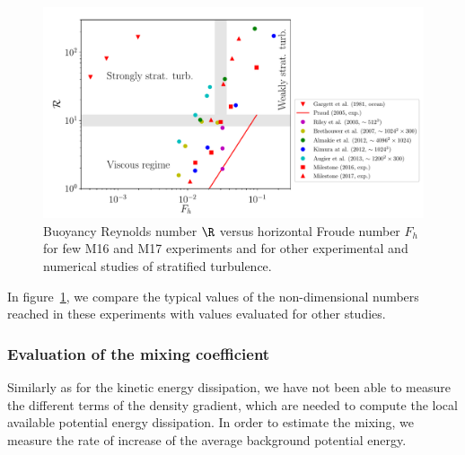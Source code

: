 \begin{figure}[htp!]
\centering
\includegraphics[width=\figwidth]{tmp/fig_R_vs_Fh_other_studies_with_milestone17}%

\caption{Buoyancy Reynolds number $\R$ versus horizontal Froude number $F_h$
for few M16 and M17 experiments and for other experimental and numerical
studies of stratified turbulence.}%
\label{fig:RvsFh:other}

\end{figure}

In figure~\ref{fig:RvsFh:other}, we compare the typical values of the
non-dimensional numbers reached in these experiments with values evaluated for
other studies.


\subsubsection{Evaluation of the mixing coefficient}

Similarly as for the kinetic energy dissipation, we have not been able to
measure the different terms of the density gradient, which are needed to
compute the local available potential energy dissipation. In order to estimate
the mixing, we measure the rate of increase of the average background potential
energy.

